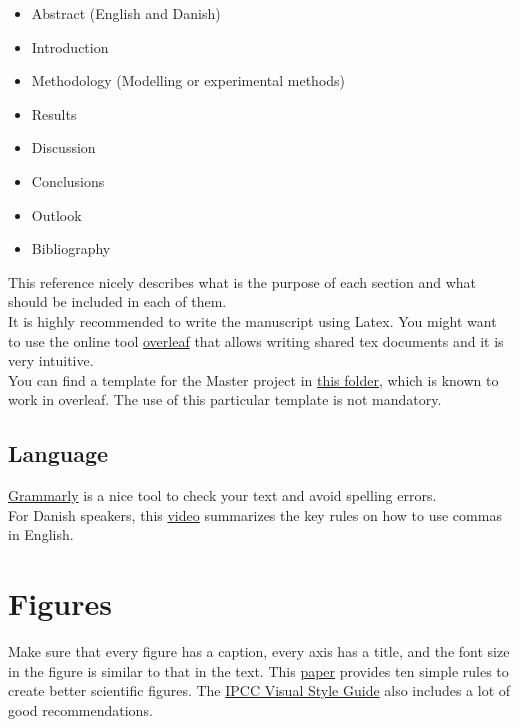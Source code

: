 \documentclass[3p]{elsarticle} %
\begin{document}
\begin{itemize}
\item Abstract (English and Danish)
\item Introduction
\item Methodology (Modelling or experimental methods) 
\item Results
\item Discussion
\item Conclusions
\item Outlook
\item Bibliography
\end{itemize}

This reference \cite{Socolofsky_2004} nicely describes what is the purpose of each section and what should be included in each of them. \\

It is highly recommended to write the manuscript using Latex. You might want to use the online tool \href{https://es.overleaf.com}{overleaf} that allows writing shared tex documents and it is very intuitive.\\

You can find a template for the Master project in \href{https://github.com/martavp/resources_master/tree/master/LatexTemplate_MasterThesisProject}{this folder}, which is known to work in overleaf. The use of this particular template is not mandatory.

\subsection{Language}

\href{https://app.grammarly.com/}{Grammarly} is a nice tool to check your text and avoid spelling errors. \\

For Danish speakers, this \href{https://www.youtube.com/watch?v=I_i9bvv3N4M}{video} summarizes the key rules on how to use commas in English. 

\section{Figures}

Make sure that every figure has a caption, every axis has a title, and the font size in the figure is similar to that in the text. This \href{https://doi.org/10.1371/journal.pcbi.1003833}{paper} provides ten simple rules to create better scientific figures. The \href{https://www.ipcc.ch/site/assets/uploads/2019/04/IPCC-visual-style-guide.pdf}{IPCC Visual Style Guide} also includes a lot of good recommendations. 
\end{document}
